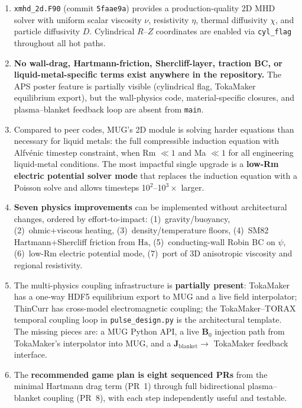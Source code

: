 \documentclass[11pt,letterpaper]{article}
\begin{document}
\begin{enumerate}[label=\textbf{ES-\arabic*.}]
  \item \texttt{xmhd\_2d.F90} (commit \texttt{5faae9a}) provides a
    production-quality 2D MHD solver with uniform scalar viscosity $\nu$,
    resistivity $\eta$, thermal diffusivity $\chi$, and particle diffusivity
    $D$.  Cylindrical $R$--$Z$ coordinates are enabled via \texttt{cyl\_flag}
    throughout all hot paths.

  \item \textbf{No wall-drag, Hartmann-friction, Shercliff-layer, traction BC,
    or liquid-metal-specific terms exist anywhere in the repository.}  The APS
    poster feature is partially visible (cylindrical flag, TokaMaker equilibrium
    export), but the wall-physics code, material-specific closures, and
    plasma--blanket feedback loop are absent from \texttt{main}.

  \item Compared to peer codes, MUG's 2D module is solving harder equations
    than necessary for liquid metals: the full compressible induction equation
    with Alfv\'{e}nic timestep constraint, when Rm $\ll 1$ and Ma $\ll 1$ for
    all engineering liquid-metal conditions.  The most impactful single upgrade
    is a \textbf{low-Rm electric potential solver mode} that replaces the
    induction equation with a Poisson solve and allows timesteps 10$^2$--10$^3\times$
    larger.

  \item \textbf{Seven physics improvements} can be implemented without
    architectural changes, ordered by effort-to-impact:
    (1)~gravity/buoyancy, (2)~ohmic+viscous heating, (3)~density/temperature
    floors, (4)~SM82 Hartmann+Shercliff friction from $\mathrm{Ha}$, (5)~conducting-wall
    Robin BC on $\psi$, (6)~low-Rm electric potential mode, (7)~port of 3D
    anisotropic viscosity and regional resistivity.

  \item The multi-physics coupling infrastructure is \textbf{partially present}:
    TokaMaker has a one-way HDF5 equilibrium export to MUG and a live field
    interpolator; ThinCurr has cross-model electromagnetic coupling; the
    TokaMaker--TORAX temporal coupling loop in \texttt{pulse\_design.py} is the
    architectural template.  The missing pieces are: a MUG Python API, a live
    $\mathbf{B}_0$ injection path from TokaMaker's interpolator into MUG, and a
    $\mathbf{J}_{\mathrm{blanket}} \to$ TokaMaker feedback interface.

  \item The \textbf{recommended game plan is eight sequenced PRs} from the
    minimal Hartmann drag term (PR~1) through full bidirectional plasma--blanket
    coupling (PR~8), with each step independently useful and testable.
\end{enumerate}
\end{document}
